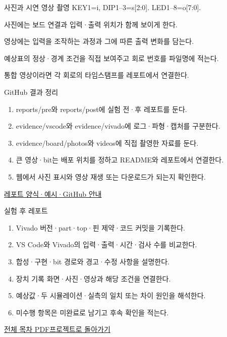 \begin{frame}{사진과 시연 영상 촬영}\relax
\small
KEY1=i, DIP1–3=s[2:0]. LED1–8=o[7:0].\par\vspace{0.22cm}사진에는 보드 연결과 입력·출력 위치가 함께 보이게 한다.\par\vspace{0.22cm}영상에는 입력을 조작하는 과정과 그에 따른 출력 변화를 담는다.\par\vspace{0.22cm}예상표의 정상·경계 조건을 직접 보여주고 회로 번호를 파일명에 적는다.\par\vspace{0.22cm}통합 영상이라면 각 회로의 타임스탬프를 레포트에서 연결한다.\par
\end{frame}

\begin{frame}{GitHub 결과 정리}\relax
\small
\begin{enumerate}\setlength{\itemsep}{0.22cm}
\item reports/pre와 reports/post에 실험 전·후 레포트를 둔다.
\item evidence/vscode와 evidence/vivado에 로그·파형·캡처를 구분한다.
\item evidence/board/photos와 videos에 직접 촬영한 자료를 둔다.
\item 큰 영상·bit는 배포 위치를 정하고 README와 레포트에서 연결한다.
\item 웹에서 사진 표시와 영상 재생 또는 다운로드가 되는지 확인한다.
\end{enumerate}
\href{https://github.com/Glaysia/ece2_26_2_2/blob/daily/0910/example/fpga_projects_hdl/LAB1/docs/reports.md}{레포트 양식·예시·GitHub 안내}
\end{frame}

\begin{frame}{실험 후 레포트}\relax
\small
\begin{enumerate}\setlength{\itemsep}{0.22cm}
\item Vivado 버전·part·top·핀 제약·코드 커밋을 기록한다.
\item VS Code와 Vivado의 입력·출력·시간·검사 수를 비교한다.
\item 합성·구현·bit 경로와 경고·수정 사항을 설명한다.
\item 장치 기록 화면·사진·영상과 해당 조건을 연결한다.
\item 예상값·두 시뮬레이션·실측의 일치 또는 차이 원인을 해석한다.
\item 미수행 항목은 미완료로 남기고 후속 확인을 적는다.
\end{enumerate}
\href{04.LAB1_00_CONTENTS.pdf}{전체 목차 PDF}\quad\href{https://github.com/Glaysia/fpga-lab-example-vivado-2026-1-07-demux1to8/tree/3e8c1e3f1cef7f602d586e152754182f43ac3679}{프로젝트로 돌아가기}
\end{frame}
\endgroup

